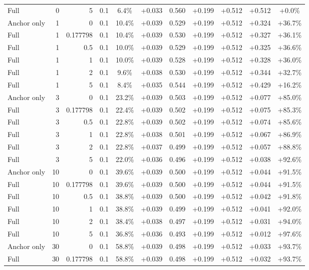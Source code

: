 \begin{table}[htbp]
\begin{tabular}{lrrrccccccc}
Full & 0 & 5 & 0.1 & 6.4\% & +0.033 & 0.560 & +0.199 & +0.512 & +0.512 & +0.0\% \\
Anchor only & 1 & 0 & 0.1 & 10.4\% & +0.039 & 0.529 & +0.199 & +0.512 & +0.324 & +36.7\% \\
Full & 1 & 0.177798 & 0.1 & 10.4\% & +0.039 & 0.530 & +0.199 & +0.512 & +0.327 & +36.1\% \\
Full & 1 & 0.5 & 0.1 & 10.0\% & +0.039 & 0.529 & +0.199 & +0.512 & +0.325 & +36.6\% \\
Full & 1 & 1 & 0.1 & 10.0\% & +0.039 & 0.528 & +0.199 & +0.512 & +0.328 & +36.0\% \\
Full & 1 & 2 & 0.1 & 9.6\% & +0.038 & 0.530 & +0.199 & +0.512 & +0.344 & +32.7\% \\
Full & 1 & 5 & 0.1 & 8.4\% & +0.035 & 0.544 & +0.199 & +0.512 & +0.429 & +16.2\% \\
Anchor only & 3 & 0 & 0.1 & 23.2\% & +0.039 & 0.503 & +0.199 & +0.512 & +0.077 & +85.0\% \\
Full & 3 & 0.177798 & 0.1 & 22.4\% & +0.039 & 0.502 & +0.199 & +0.512 & +0.075 & +85.3\% \\
Full & 3 & 0.5 & 0.1 & 22.8\% & +0.039 & 0.502 & +0.199 & +0.512 & +0.074 & +85.6\% \\
Full & 3 & 1 & 0.1 & 22.8\% & +0.038 & 0.501 & +0.199 & +0.512 & +0.067 & +86.9\% \\
Full & 3 & 2 & 0.1 & 22.8\% & +0.037 & 0.499 & +0.199 & +0.512 & +0.057 & +88.8\% \\
Full & 3 & 5 & 0.1 & 22.0\% & +0.036 & 0.496 & +0.199 & +0.512 & +0.038 & +92.6\% \\
Anchor only & 10 & 0 & 0.1 & 39.6\% & +0.039 & 0.500 & +0.199 & +0.512 & +0.044 & +91.5\% \\
Full & 10 & 0.177798 & 0.1 & 39.6\% & +0.039 & 0.500 & +0.199 & +0.512 & +0.044 & +91.5\% \\
Full & 10 & 0.5 & 0.1 & 38.8\% & +0.039 & 0.500 & +0.199 & +0.512 & +0.042 & +91.8\% \\
Full & 10 & 1 & 0.1 & 38.8\% & +0.039 & 0.499 & +0.199 & +0.512 & +0.041 & +92.0\% \\
Full & 10 & 2 & 0.1 & 38.4\% & +0.038 & 0.497 & +0.199 & +0.512 & +0.031 & +94.0\% \\
Full & 10 & 5 & 0.1 & 36.8\% & +0.036 & 0.493 & +0.199 & +0.512 & +0.012 & +97.6\% \\
Anchor only & 30 & 0 & 0.1 & 58.8\% & +0.039 & 0.498 & +0.199 & +0.512 & +0.033 & +93.7\% \\
Full & 30 & 0.177798 & 0.1 & 58.8\% & +0.039 & 0.498 & +0.199 & +0.512 & +0.032 & +93.7\% \\

\end{tabular}
\end{table}
